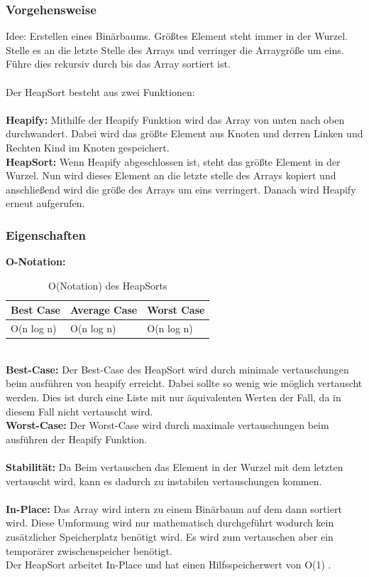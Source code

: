\documentclass{article}
\begin{document}
\subsubsection*{Vorgehensweise}
Idee: Erstellen eines Binärbaums. Größtes Element steht immer in der Wurzel. Stelle es an die letzte Stelle des Arrays und verringer die Arraygröße um eins. Führe dies rekursiv durch bis das Array sortiert ist.\\
\\
Der HeapSort besteht aus zwei Funktionen:\\\\
\textbf{Heapify:} Mithilfe der Heapify Funktion wird das Array von unten nach oben durchwandert. Dabei wird das größte Element aus Knoten und derren Linken und Rechten Kind im Knoten gespeichert. \\
\textbf{HeapSort:} Wenn Heapify abgeschlossen ist, steht das größte Element in der Wurzel. Nun wird dieses Element an die letzte stelle des Arrays kopiert und anschließend wird die größe des Arrays um eins verringert. Danach wird Heapify erneut aufgerufen.\\
\subsubsection*{Eigenschaften}
\textbf{O-Notation:}
\begin{table}[h]
\centering
\begin{tabular}{lll}
	\hline
	\textbf{Best Case} & \textbf{Average Case} & \textbf{Worst Case} \\
	\hline
	O(n log n) & O(n log n) & O(n log n) \\
	\hline
\end{tabular}
\caption{O(Notation) des HeapSorts \cite{India2015Dataset}}
\label{tab:HeapSort}
\end{table}
\\
\textbf{Best-Case:} Der Best-Case des HeapSort wird durch minimale vertauschungen beim ausführen von heapify erreicht. Dabei sollte so wenig wie möglich vertauscht werden. Dies ist durch eine Liste mit nur äquivalenten Werten der Fall, da in diesem Fall nicht vertauscht wird. \\
\textbf{Worst-Case:} Der Worst-Case wird durch maximale vertauschungen beim ausführen der Heapify Funktion. \\\\
\textbf{Stabilität:} Da Beim vertauschen das Element in der Wurzel mit dem letzten vertauscht wird, kann es dadurch zu instabilen vertauschungen kommen.  \\
\\
\textbf{In-Place:} Das Array wird intern zu einem Binärbaum auf dem dann sortiert wird. Diese Umformung wird nur mathematisch durchgeführt wodurch kein zusätzlicher Speicherplatz benötigt wird. Es wird zum vertauschen aber ein temporärer zwischenspeicher benötigt. \\Der HeapSort arbeitet In-Place und hat einen Hilfsspeicherwert von O(1) \cite{India2015Dataset}.\\
\end{document}
